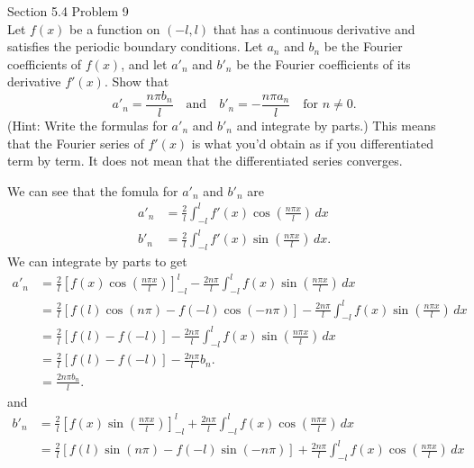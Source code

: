 \documentclass[answers,12pt,addpoints]{exam}
\begin{document}
\begin{questions}
    \question[10] Section 5.4 Problem 9\\
    Let $f(x)$ be a function on $(-l, l)$ that has a continuous derivative and
    satisfies the periodic boundary conditions. Let $a_n$ and $b_n$ be the Fourier coefficients of
    $f(x)$, and let $a'_n$ and $b'_n$ be the Fourier coefficients of its derivative $f'(x)$.
    Show that
    \[
    a'_n = \frac{n\pi b_n}{l} \quad \text{and} \quad b'_n = -\frac{n\pi a_n}{l} \quad \text{for } n \neq 0.
    \]
    (Hint: Write the formulas for $a'_n$ and $b'_n$ and integrate by parts.) This
    means that the Fourier series of $f'(x)$ is what you’d obtain as if you
    differentiated term by term. It does not mean that the differentiated series
    converges.
    \begin{solution}
        We can see that the fomula for $a'_n$ and $b'_n$ are
        \begin{align*}
            a'_n &= \frac{2}{l} \int_{-l}^{l} f'(x) \cos \left( \frac{n\pi x}{l} \right) \, dx \\
            b'_n &= \frac{2}{l} \int_{-l}^{l} f'(x) \sin \left( \frac{n\pi x}{l} \right) \, dx.
        \end{align*}
        We can integrate by parts to get
        \begin{align*}
            a'_n &= \frac{2}{l} \left[ f(x) \cos \left( \frac{n\pi x}{l} \right) \right]_{-l}^{l} - \frac{2n\pi}{l} \int_{-l}^{l} f(x) \sin \left( \frac{n\pi x}{l} \right) \, dx \\
            &= \frac{2}{l} \left[ f(l) \cos \left( n\pi \right) - f(-l) \cos \left( -n\pi \right) \right] - \frac{2n\pi}{l} \int_{-l}^{l} f(x) \sin \left( \frac{n\pi x}{l} \right) \, dx \\
            &= \frac{2}{l} \left[ f(l) - f(-l) \right] - \frac{2n\pi}{l} \int_{-l}^{l} f(x) \sin \left( \frac{n\pi x}{l} \right) \, dx \\
            &= \frac{2}{l} \left[ f(l) - f(-l) \right] - \frac{2n\pi}{l} b_n.\\
            &= \frac{2n\pi b_n}{l}.
        \end{align*}
        and 
        \begin{align*}
            b'_n &= \frac{2}{l} \left[ f(x) \sin \left( \frac{n\pi x}{l} \right) \right]_{-l}^{l} + \frac{2n\pi}{l} \int_{-l}^{l} f(x) \cos \left( \frac{n\pi x}{l} \right) \, dx \\
            &= \frac{2}{l} \left[ f(l) \sin \left( n\pi \right) - f(-l) \sin \left( -n\pi \right) \right] + \frac{2n\pi}{l} \int_{-l}^{l} f(x) \cos \left( \frac{n\pi x}{l} \right) \, dx \\

\end{align*}
\end{solution}
\end{questions}
\end{document}
